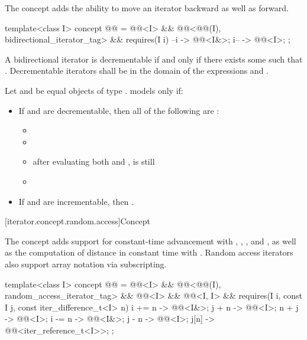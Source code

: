\pnum
The  concept adds the ability
to move an iterator backward as well as forward.

\begin{codeblock}
template<class I>
  concept @@ =
    @@<I> &&
    @@<@@(I), bidirectional_iterator_tag> &&
    requires(I i) {
      { --i } -> @@<I&>;
      { i-- } -> @@<I>;
    };
\end{codeblock}

\pnum
A bidirectional iterator  is decrementable if and only if there exists some  such that
. Decrementable iterators  shall be in the domain of the expressions
 and .

\pnum
Let  and  be equal objects of type .
 models  only if:
\begin{itemize}
\item If  and  are decrementable,
  then all of the following are :
  \begin{itemize}
  \item {}
  \item {}
  \item after evaluating both  and ,
     is still 
  \item {}
  \end{itemize}
  \item If  and  are incrementable, then
    .
\end{itemize}

[iterator.concept.random.access]{Concept }

\pnum
The  concept adds support for
constant-time advancement with \tcode{+=}, \tcode{+}, \tcode{-=}, and \tcode{-},
as well as the computation of distance in constant time with \tcode{-}.
Random access iterators also support array notation via subscripting.

\begin{codeblock}
template<class I>
  concept @@ =
    @@<I> &&
    @@<@@(I), random_access_iterator_tag> &&
    @@<I> &&
    @@<I, I> &&
    requires(I i, const I j, const iter_difference_t<I> n) {
      { i += n } -> @@<I&>;
      { j +  n } -> @@<I>;
      { n +  j } -> @@<I>;
      { i -= n } -> @@<I&>;
      { j -  n } -> @@<I>;
      {  j[n]  } -> @@<iter_reference_t<I>>;
    };
\end{codeblock}

